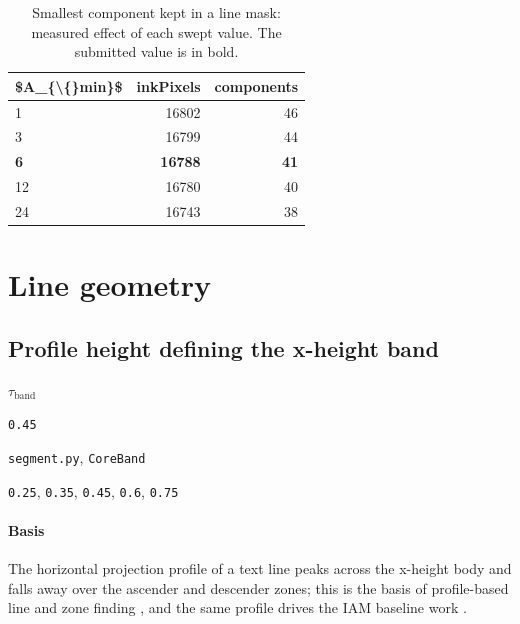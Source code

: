 \begin{table}[htbp]
\centering
\small
\caption{Smallest component kept in a line mask: measured effect of each swept value. The submitted value is in bold.}
\begin{tabular}{lrr}
\toprule
\$A\_\{\textbackslash\{\}min\}\$ & \textsf{inkPixels} & \textsf{components} \\
\midrule
1 & 16802 & 46 \\
3 & 16799 & 44 \\
\bfseries 6 & \bfseries 16788 & \bfseries 41 \\
12 & 16780 & 40 \\
24 & 16743 & 38 \\
\bottomrule
\end{tabular}
\end{table}

\section{Line geometry}

\subsection{Profile height defining the x-height band}

\label{coef:core-band-frac}

\begin{description}[leftmargin=5.2em,style=sameline]

\item[Symbol] $\tau_{\text{band}}$

\item[Value] \texttt{0.45}

\item[Source] \texttt{segment.py}, \texttt{CoreBand}

\item[Swept] \texttt{0.25}, \texttt{0.35}, \texttt{0.45}, \texttt{0.6}, \texttt{0.75}

\end{description}

\paragraph{Basis}

The horizontal projection profile of a text line peaks across the x-height body and falls away over the ascender and descender zones; this is the basis of profile-based line and zone finding \cite{likforman2007}, and the same profile drives the IAM baseline work \cite{marti2002}.

